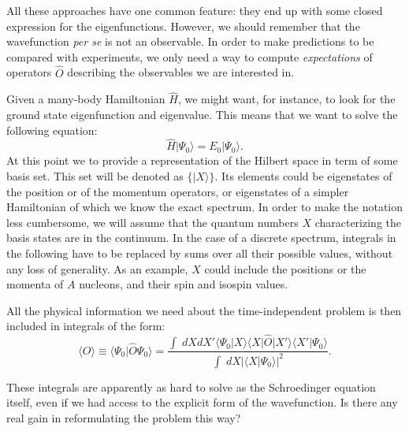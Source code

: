 All these approaches have one common feature: they end up with some closed expression for the eigenfunctions. However, we should remember that the wavefunction {\it per se} is not an observable. In order to make predictions to be compared with experiments, we only need a way to compute {\it expectations} of operators $\hat{O}$ describing the observables we are interested in. 

Given a many-body Hamiltonian $\hat{H}$, we might want, for instance, to look for the ground state eigenfunction and eigenvalue. This means that we want to solve the following equation:
\begin{equation}
\label{eqchap9.s}
\hat{H}\vert \Psi_0\rangle=E_0\vert \Psi_0\rangle.
\end{equation}  
At this point we to provide a representation of the Hilbert space in term of some basis set.
This set will be denoted as $\{|X\rangle\}$. Its elements could be eigenstates of the position
or of the momentum operators, or eigenstates of a simpler Hamiltonian of which we know the exact spectrum. 
In order to make the notation less cumbersome, we will assume that the quantum numbers $X$ characterizing the basis states are in the continuum. In the case of a discrete spectrum, integrals in the following have to be replaced by sums over all their possible values, without any loss of generality. As an example, $X$ could include the positions or the momenta of $A$ nucleons, and their spin and isospin values.  

All the physical information we need about the time-independent problem is then included in integrals of the form:
\begin{equation}
\langle O\rangle \equiv\langle \Psi_0\vert\hat{O}\Psi_0\rangle =\frac{\displaystyle\int\; dX dX'\langle \Psi_0\vert X\rangle\langle X\vert \hat{O}\vert X'\rangle\langle X'\vert\Psi_0\rangle}
{\displaystyle\int\; dX \vert\langle X\vert \Psi_0\rangle\vert^2}.
\end{equation}


These integrals are apparently as hard to solve as the Schroedinger equation itself, even if we had access to the explicit form of the wavefunction. Is there any real gain in reformulating the problem this way?

